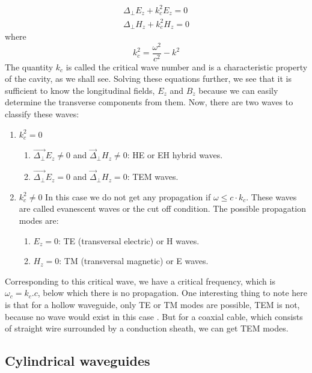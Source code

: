 \documentclass[a4paper]{article}
\begin{document}
\begin{align}
		\Delta_{\perp}E_{z} + k_{c}^2 E_{z} = 0 \\
		\Delta_{\perp}H_{z} + k_{c}^2 H_{z} = 0 
\end{align}
where 
\[
		k_{c}^2 = \frac{\omega^2 }{c^2 } - k^2   
\]
The quantity $k_{c} $ is called the critical wave number and is a characteristic property of the cavity, as we shall see. 
Solving these equations further, we see that it is sufficient to know the longitudinal fields, $E_{z} $ and $B_{z} $ because we can easily determine the transverse components from them. 
Now, there are two waves to classify these waves: 
\begin{enumerate}
		\item $k_{c}^2 = 0  $ 
				\begin{enumerate}
						\item $\vec{\Delta_{\perp} }E_{z}  \ne 0$ and $\vec{\Delta}_{\perp}H_{z} \ne 0  $: HE or EH hybrid waves.
						\item $\vec{\Delta_{\perp} }E_{z}  = 0$ and $\vec{\Delta}_{\perp}H_{z} = 0  $: TEM waves.
				\end{enumerate}
		\item $k_{c}^2 \ne 0  $ 
		In this case we do not get any propagation if $\omega \leq c \cdot k_{c} $. These waves are called evanescent waves or the cut off condition. The possible propagation modes are: 
		\begin{enumerate}
				\item $E_{z}=0 $: TE (transversal electric) or H waves.
				\item $H_{z}=0 $: TM (transversal magnetic) or E waves.
		\end{enumerate}
		
\end{enumerate}

Corresponding to this critical wave, we have a critical frequency, which is $\omega_{c} = k_{c}.c $, below which there is no propagation. 
One interesting thing to note here is that for a hollow waveguide, only TE or TM modes are possible, TEM is not, because no wave would exist in this case \cite{}. But for a coaxial cable, which consists of straight wire surrounded by a conduction sheath, we can get TEM modes.

\subsection{Cylindrical waveguides}
\end{document}
